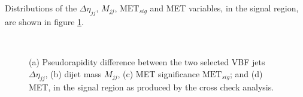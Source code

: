 Distributions of the $\Delta\eta_{jj}$, $M_{jj}$, $\text{MET}_{sig}$ and \gls{MET} variables, in the signal region, are shown in figure \ref{FIGURE:ParkedDataAnalysis_Results_SigRegPlots}. 

\begin{figure}[!htb]
\centering
{}
 \\
\caption{(a) Pseudorapidity difference between the two selected \gls{VBF} jets $\Delta\eta_{jj}$, (b) dijet mass $M_{jj}$, (c) \gls{MET} significance $\text{MET}_{sig}$; and (d) \gls{MET}, in the signal region as produced by the cross check analysis.}
\label{FIGURE:ParkedDataAnalysis_Results_SigRegPlots}
\end{figure}

